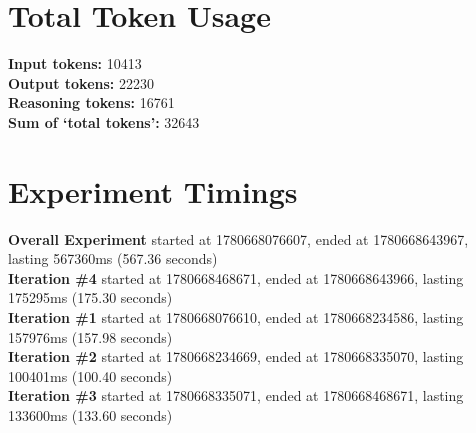 \documentclass{article}
\begin{document}
\section*{Total Token Usage}
\textbf{Input tokens: }10413
\\\textbf{Output tokens: }22230
\\\textbf{Reasoning tokens: }16761
\\\textbf{Sum of `total tokens': }32643
\section*{Experiment Timings}
\textbf{Overall Experiment} started at 1780668076607, ended at 1780668643967, lasting 567360ms (567.36 seconds)
\\\textbf{Iteration \#4} started at 1780668468671, ended at 1780668643966, lasting 175295ms (175.30 seconds)
\\\textbf{Iteration \#1} started at 1780668076610, ended at 1780668234586, lasting 157976ms (157.98 seconds)
\\\textbf{Iteration \#2} started at 1780668234669, ended at 1780668335070, lasting 100401ms (100.40 seconds)
\\\textbf{Iteration \#3} started at 1780668335071, ended at 1780668468671, lasting 133600ms (133.60 seconds)
\end{document}
